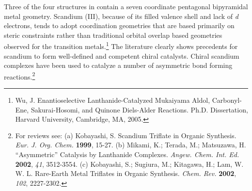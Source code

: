  Three of the four
 structures in  contain a seven
 coordinate pentagonal bipyramidal metal geometry. Scandium (III), because of its filled valence shell
 and lack of \textit{d} electrons, tends to adopt coordination geometries that are based primarily
 on steric constraints rather than traditional orbital overlap based geometries
 observed for the transition metals.\footnote{{\frenchspacing Wu, J. Enantioselective
 Lanthanide-Catalyzed Mukaiyama Aldol, Carbonyl-Ene, Sakurai-Hosomi, and Quinone Diels-Alder Reactions. Ph.D. Dissertation, Harvard University, Cambridge, MA, 2005.} } The
 literature clearly shows precedents for scandium to form well-defined and competent chiral
 catalysts. Chiral scandium complexes have been used to
 catalyze a number of asymmetric  bond forming reactions.\footnote{For reviews see: (a) {\frenchspacing Kobayashi, S.
 Scandium Triflate in Organic Synthesis. \textit{Eur. J. Org. Chem.} \textbf{1999}, 15-27.} (b)
 {\frenchspacing Mikami, K.; Terada, M.; Matsuzawa, H.
 ``Asymmetric'' Catalysis by Lanthanide Complexes. \textit{Angew. Chem. Int. Ed.} \textbf{2002},
 \textit{41}, 3512-3554.} (c) {\frenchspacing Kobayashi, S.; Sugiura, M.; Kitagawa, H.; Lam, W. W.
 L. Rare-Earth Metal Triflates in Organic Synthesis. \textit{Chem. Rev.} \textbf{2002},
 \textit{102}, 2227-2302.}} 
 


 
  
